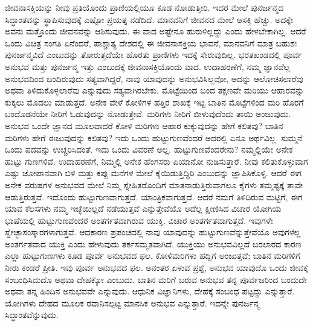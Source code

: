 ಜೀವನಾಸಕ್ತಿಯನ್ನು ನೀವು ಪ್ರತಿಯೊಂದು ಪ್ರಾಣಿಯಲ್ಲಿಯೂ ಕೂಡ ನೋಡುತ್ತೀರಿ. ಇದರ ಮೇಲೆ ಪುನರ್ಜನ್ಮದ ಸಿದ್ಧಾಂತವನ್ನು ಸ್ಥಾಪಿಸುವುದಕ್ಕೆ ಎಷ್ಟೋ ಪ್ರಯತ್ನ ನಡೆದಿದೆ. ಮಾನವನಿಗೆ ಜೀವನದ ಮೇಲೆ ಆಸಕ್ತಿ ಹೆಚ್ಚು. ಅದಕ್ಕೇ ಅವನು ಮತ್ತೊಂದು ಜೀವನವನ್ನು ಆಶಿಸುವುದು. ಈ ವಾದ ಅಷ್ಟೇನೂ ಹುರುಳಿಲ್ಲದ್ದು ಎಂದು ಹೇಳಬೇಕಾಗಿಲ್ಲ. ಆದರೆ ಒಂದು ವಿಚಿತ್ರ ಸಂಗತಿ ಏನೆಂದರೆ, ಪಾಶ್ಚಾತ್ಯ ದೇಶದಲ್ಲಿ ಈ ಜೀವನಾಸಕ್ತಿಯ ಭಾವನೆ, ಮಾನವನಿಗೆ ಮಾತ್ರ ಬಹುಶಃ ಪುನರ್ಜನ್ಮವಿದೆ ಎಂಬುದನ್ನು ತೋರುತ್ತದೆಯೇ ಹೊರತು ಪ್ರಾಣಿಗಳು ಇದಕ್ಕೆ ಸೇರುವುದಿಲ್ಲ. ಭರತಖಂಡದಲ್ಲಿ ಪೂರ್ವ ಅನುಭವ ಮತ್ತು ಪುನರ್ಜನ್ಮ ಇತ್ತು ಎಂಬುದಕ್ಕೆ ಜೀವನಾಸಕ್ತಿಯೊಂದು ವಾದ. ಉದಾಹರಣೆಗೆ, ನಮ್ಮ ಜ್ಞಾನವೆಲ್ಲ ಅನುಭವದಿಂದ ಬಂದಿರುವುದು ಸತ್ಯವಾಗಿದ್ದರೆ, ನಾವು ಯಾವುದನ್ನು ಅನುಭವಿಸಿಲ್ಲವೋ, ಅದನ್ನು ಆಲೋಚಿಸಲಾರೆವು ಅಥವಾ ತಿಳಿದುಕೊಳ್ಳಲಾರೆವು ಎನ್ನುವುದು ಸತ್ಯವಾಗಿರಬೇಕು. ಮೊಟ್ಟೆಯಿಂದ ಬಂದ ತಕ್ಷಣವೇ ಮರಿಯು ಆಹಾರವನ್ನು ಕುಕ್ಕಲು ಮೊದಲು ಮಾಡುತ್ತದೆ. ಅನೇಕ ವೇಳೆ ಕೋಳಿಗಳ ಹತ್ತಿರ ಶಾಖಕ್ಕೆ ಇಟ್ಟ ಬಾತಿನ ಮೊಟ್ಟೆಗಳಿಂದ ಮರಿ ಹೊರಗೆ ಬಂದೊಡನೆಯೇ ನೀರಿಗೆ ಓಡುವುದನ್ನು ನೋಡುತ್ತೇವೆ. ಮರಿಗಳು ನೀರಿಗೆ ಬೀಳುವುದೆಂದು ತಾಯಿ ಅಂಜುವುದು. ಅನುಭವ ಒಂದೇ ಜ್ಞಾನದ ಮೂಲವಾದರೆ ಕೋಳಿ ಮರಿಗಳು ಆಹಾರ ಕುಕ್ಕುವುದನ್ನು ಹೇಗೆ ಕಲಿತವು? ಬಾತಿನ ಮರಿಗಳು ಹೇಗೆ ಈಜುವುದನ್ನು ಕಲಿತವು? ಇದು ಒಂದು ಹುಟ್ಟುಗುಣವೆಂದರೆ ಅದರಲ್ಲಿ ಏನೂ ಅರ್ಥವಿಲ್ಲ. ಸುಮ್ಮನೆ ಒಂದು ಪದವನ್ನು ಉಚ್ಚರಿಸಿದಂತೆ. ಇದು ಒಂದು ವಿವರಣೆ ಅಲ್ಲ. ಹುಟ್ಟುಗುಣವೆಂದರೇನು? ನಮ್ಮಲ್ಲಿಯೇ ಅನೇಕ ಹುಟ್ಟು ಗುಣಗಳಿವೆ. ಉದಾಹರಣೆಗೆ, ನಿಮ್ಮಲ್ಲಿ ಅನೇಕ ಹೆಂಗಸರು ಪಿಯಾನೋ ನುಡಿಸುತ್ತಾರೆ. ನೀವು ಕಲಿತುಕೊಳ್ಳುವಾಗ ಎಷ್ಟು ಜೋಪಾನವಾಗಿ ಬಿಳಿ ಮತ್ತು ಕಪ್ಪು ಮನೆಗಳ ಮೇಲೆ ಕೈಯಿಡುತ್ತಿದ್ದಿರಿ ಎಂಬುದನ್ನು ಜ್ಞಾಪಿಸಿಕೊಳ್ಳಿ. ಆದರೆ ಈಗ ಅನೇಕ ವರುಷಗಳ ಅನುಭವದ ಮೇಲೆ ನಿಮ್ಮ ಸ್ನೇಹಿತರೊಂದಿಗೆ ಮಾತನಾಡುತ್ತಿರುವಾಗಲೂ ಕೈಗಳು ತಮ್ಮಷ್ಟಕ್ಕೆ ತಾವೇ ಆಡುತ್ತಿರುತ್ತವೆ. ಇದೊಂದು ಹುಟ್ಟುಗುಣವಾಗುತ್ತದೆ. ಯಾಂತ್ರಿಕವಾಗುತ್ತದೆ. ಆದರೆ ನಮಗೆ ತಿಳಿದಿರುವ ಮಟ್ಟಿಗೆ, ಈಗ ಯಾವ ಕೆಲಸಗಳು ನಮ್ಮ ಇಚ್ಛೆಯಿಲ್ಲದೆ ನಡೆಯುತ್ತವೆ ಎನ್ನುತ್ತೇವೆಯೊ ಅದೆಲ್ಲ ಕ್ಷೀಣಿಸಿದ ವಿಚಾರ ಯೋಗಿಯ ಭಾಷೆಯಲ್ಲಿ ಹುಟ್ಟುಗುಣವೆಂದರೆ ಅಂತರ್ಗತವಾಗಿರುವ ಯುಕ್ತಿ. ವಿಚಾರ ಅಂತರ್ಗತವಾಗುತ್ತದೆ. ಇವುಗಳೇ ಸ್ವೇಚ್ಛಾಸಂಸ್ಕಾರಗಳಾಗುತ್ತವೆ. ಆದಕಾರಣ ಪ್ರಪಂಚದಲ್ಲಿ ನಾವು ಯಾವುದನ್ನು ಹುಟ್ಟುಗುಣವೆನ್ನುತ್ತೇವೆಯೊ ಅವುಗಳೆಲ್ಲ ಅಂತರ್ಗತವಾದ ಯುಕ್ತಿ ಎಂದು ಹೇಳುವುದು ತರ್ಕಸಮ್ಮತವಾಗಿದೆ. ಯುಕ್ತಿಯು ಅನುಭವವಿಲ್ಲದೆ ಬರಲಾರದ ಕಾರಣ ಎಲ್ಲಾ ಹುಟ್ಟುಗುಣಗಳು ಕೂಡ ಪೂರ್ವ ಅನುಭವದ ಫಲ. ಕೋಳಿಮರಿಗಳು ಹದ್ದಿಗೆ ಅಂಜುತ್ತವೆ; ಬಾತಿನ ಮರಿಗಳಿಗೆ ನೀರು ಕಂಡರೆ ಪ್ರೀತಿ. ಇವು ಪೂರ್ವ ಅನುಭವದ ಫಲ. ಅನಂತರ ಏಳುವ ಪ್ರಶ್ನೆ, ಅನುಭವ ಯಾವುದೊ ಒಂದು ಜೀವಕ್ಕೆ ಸಂಬಂಧಿಸಿದುದೊ ಅಥವಾ ದೇಹಕ್ಕೋ ಎಂಬುದು. ಬಾತಿನ ಮರಿಗೆ ಬರುವ ಅನುಭವ ತನ್ನ ಪೂರ್ವಜರಿಂದ ಬಂದುದೇ ಅಥವಾ ತನ್ನ ಹಿಂದಿನ ಅನುಭವವೇ ಎನ್ನುವುದು. ಆಧುನಿಕ ವಿಜ್ಞಾನಿಗಳು, ದೇಹಕ್ಕೆ ಸಂಬಂಧ ಪಟ್ಟದ್ದು ಎನ್ನುತ್ತಾರೆ. ಯೋಗಿಗಳು ದೇಹದ ಮೂಲಕ ರವಾನಿಸಲ್ಪಟ್ಟ ಮಾನಸಿಕ ಅನುಭವ ಎನ್ನುತ್ತಾರೆ. ಇದನ್ನೇ ಪುನರ್ಜನ್ಮ ಸಿದ್ಧಾಂತವೆನ್ನುವುದು. 

